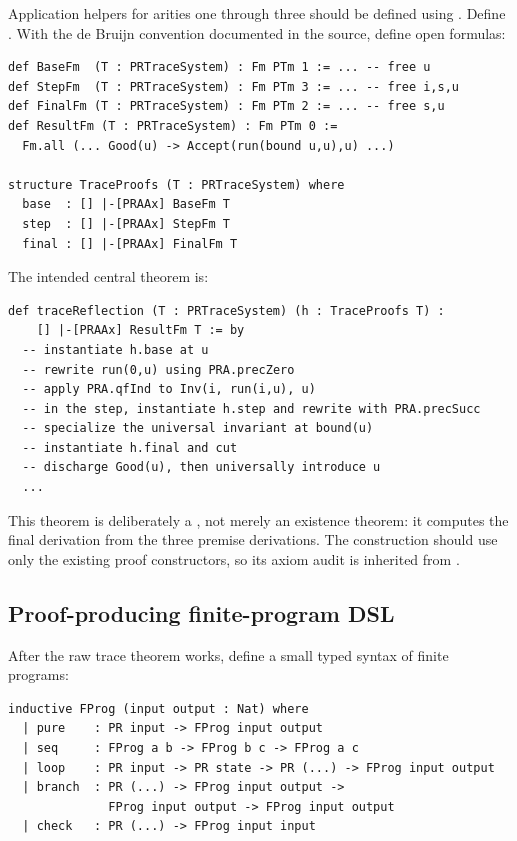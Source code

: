 Application helpers for arities one through three should be defined using
.  Define .  With the de Bruijn
convention documented in the source, define open formulas:

\begin{lstlisting}[style=lean]
def BaseFm  (T : PRTraceSystem) : Fm PTm 1 := ... -- free u
def StepFm  (T : PRTraceSystem) : Fm PTm 3 := ... -- free i,s,u
def FinalFm (T : PRTraceSystem) : Fm PTm 2 := ... -- free s,u
def ResultFm (T : PRTraceSystem) : Fm PTm 0 :=
  Fm.all (... Good(u) -> Accept(run(bound u,u),u) ...)

structure TraceProofs (T : PRTraceSystem) where
  base  : [] |-[PRAAx] BaseFm T
  step  : [] |-[PRAAx] StepFm T
  final : [] |-[PRAAx] FinalFm T
\end{lstlisting}

The intended central theorem is:

\begin{lstlisting}[style=lean]
def traceReflection (T : PRTraceSystem) (h : TraceProofs T) :
    [] |-[PRAAx] ResultFm T := by
  -- instantiate h.base at u
  -- rewrite run(0,u) using PRA.precZero
  -- apply PRA.qfInd to Inv(i, run(i,u), u)
  -- in the step, instantiate h.step and rewrite with PRA.precSucc
  -- specialize the universal invariant at bound(u)
  -- instantiate h.final and cut
  -- discharge Good(u), then universally introduce u
  ...
\end{lstlisting}

This theorem is deliberately a , not merely an existence theorem:
it computes the final derivation from the three premise derivations.  The
construction should use only the existing proof constructors, so its axiom
audit is inherited from .

\subsection{Proof-producing finite-program DSL}

After the raw trace theorem works, define a small typed syntax of finite
programs:

\begin{lstlisting}[style=lean]
inductive FProg (input output : Nat) where
  | pure    : PR input -> FProg input output
  | seq     : FProg a b -> FProg b c -> FProg a c
  | loop    : PR input -> PR state -> PR (...) -> FProg input output
  | branch  : PR (...) -> FProg input output ->
              FProg input output -> FProg input output
  | check   : PR (...) -> FProg input input
\end{lstlisting}

